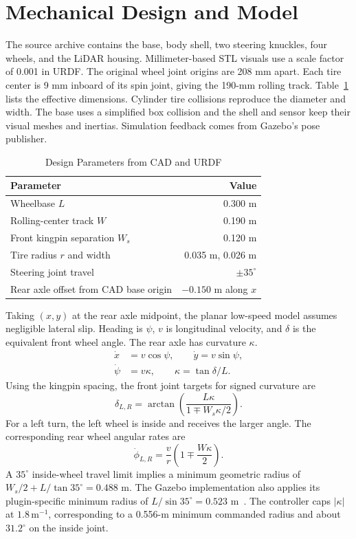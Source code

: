 \documentclass[conference]{IEEEtran}
\begin{document}
\section{Mechanical Design and Model}
The source archive contains the base, body shell, two steering knuckles, four wheels, and the LiDAR housing. Millimeter-based STL visuals use a scale factor of 0.001 in URDF. The original wheel joint origins are 208 mm apart. Each tire center is 9 mm inboard of its spin joint, giving the 190-mm rolling track. Table~\ref{tab:design} lists the effective dimensions. Cylinder tire collisions reproduce the diameter and width. The base uses a simplified box collision and the shell and sensor keep their visual meshes and inertias. Simulation feedback comes from Gazebo's pose publisher.

\begin{table}[t]
\caption{Design Parameters from CAD and URDF}
\label{tab:design}
\centering\small
\begin{tabular}{@{}lr@{}}
\hline
Parameter & Value \\ \hline
Wheelbase $L$ & 0.300 m \\
Rolling-center track $W$ & 0.190 m \\
Front kingpin separation $W_s$ & 0.120 m \\
Tire radius $r$ and width & 0.035 m, 0.026 m \\
Steering joint travel & $\pm35^\circ$ \\
Rear axle offset from CAD base origin & $-0.150$ m along $x$ \\ \hline
\end{tabular}
\end{table}

Taking $(x,y)$ at the rear axle midpoint, the planar low-speed model assumes negligible lateral slip. Heading is $\psi$, $v$ is longitudinal velocity, and $\delta$ is the equivalent front wheel angle. The rear axle has curvature $\kappa$.
\begin{align}
\dot{x} &= v\cos\psi,\qquad \dot{y}=v\sin\psi, \\
\dot{\psi} &= v\kappa,\qquad \kappa=\tan\delta/L.
\end{align}
Using the kingpin spacing, the front joint targets for signed curvature are
\begin{equation}
\delta_{L,R}=\arctan\left(\frac{L\kappa}{1\mp W_s\kappa/2}\right).
\end{equation}
For a left turn, the left wheel is inside and receives the larger angle. The corresponding rear wheel angular rates are
\begin{equation}
\dot{\phi}_{L,R}=\frac{v}{r}\left(1\mp\frac{W\kappa}{2}\right).
\end{equation}
A $35^\circ$ inside-wheel travel limit implies a minimum geometric radius of $W_s/2+L/\tan 35^\circ=0.488$ m. The Gazebo implementation also applies its plugin-specific minimum radius of $L/\sin 35^\circ=0.523$ m~\cite{gzsource}. The controller caps $|\kappa|$ at $1.8\,\mathrm{m}^{-1}$, corresponding to a 0.556-m minimum commanded radius and about $31.2^\circ$ on the inside joint.
\end{document}
